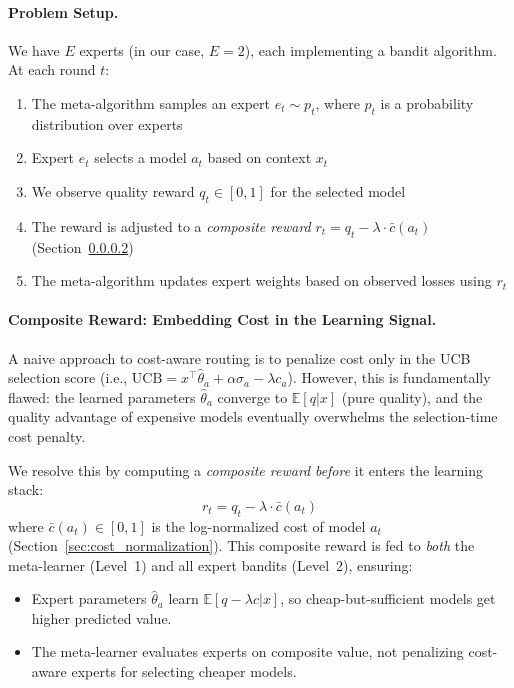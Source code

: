 \paragraph{Problem Setup.}
We have $E$ experts (in our case, $E=2$), each implementing a bandit algorithm.
At each round $t$:
\begin{enumerate}[nosep]
    \item The meta-algorithm samples an expert $e_t \sim p_t$, where $p_t$ is a probability distribution over experts
    \item Expert $e_t$ selects a model $a_t$ based on context $x_t$
    \item We observe quality reward $q_t \in [0,1]$ for the selected model
    \item The reward is adjusted to a \emph{composite reward} $r_t = q_t - \lambda \cdot \bar{c}(a_t)$ (Section~\ref{sec:composite_reward})
    \item The meta-algorithm updates expert weights based on observed losses using $r_t$
\end{enumerate}

\paragraph{Composite Reward: Embedding Cost in the Learning Signal.}
\label{sec:composite_reward}
A naive approach to cost-aware routing is to penalize cost only in the UCB selection score (i.e., $\text{UCB} = x^\top \hat{\theta}_a + \alpha\sigma_a - \lambda c_a$).
However, this is fundamentally flawed: the learned parameters $\hat{\theta}_a$ converge to $\mathbb{E}[q | x]$ (pure quality), and the quality advantage of expensive models eventually overwhelms the selection-time cost penalty.

We resolve this by computing a \emph{composite reward} \emph{before} it enters the learning stack:
\begin{equation}
r_t = q_t - \lambda \cdot \bar{c}(a_t)
\label{eq:composite_reward}
\end{equation}
where $\bar{c}(a_t) \in [0,1]$ is the log-normalized cost of model $a_t$ (Section~\ref{sec:cost_normalization}).
This composite reward is fed to \emph{both} the meta-learner (Level~1) and all expert bandits (Level~2), ensuring:
\begin{itemize}[nosep]
    \item Expert parameters $\hat{\theta}_a$ learn $\mathbb{E}[q - \lambda c | x]$, so cheap-but-sufficient models get higher predicted value.
    \item The meta-learner evaluates experts on composite value, not penalizing cost-aware experts for selecting cheaper models.
\end{itemize}

